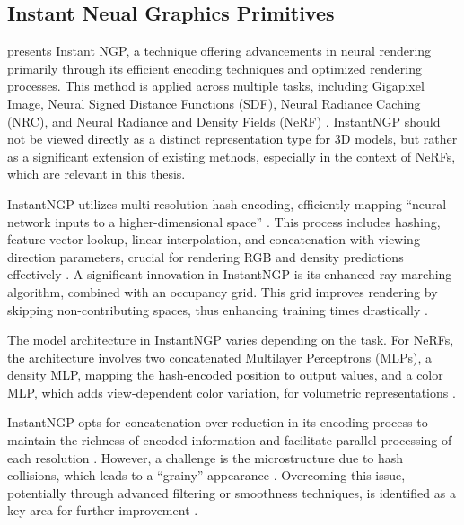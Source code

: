 \subsection{Instant Neual Graphics Primitives}\label{InstantNGP}

\citeauthor{M_ller_2022} presents Instant NGP, a technique offering advancements in neural rendering primarily through its efficient encoding techniques and optimized rendering processes. This method is applied across multiple tasks, including Gigapixel Image, Neural Signed Distance Functions (SDF), Neural Radiance Caching (NRC), and Neural Radiance and Density Fields (NeRF) \citep{M_ller_2022}. InstantNGP should not be viewed directly as a distinct representation type for 3D models, but rather as a significant extension of existing methods, especially in the context of NeRFs, which are relevant in this thesis.

InstantNGP utilizes multi-resolution hash encoding, efficiently mapping ``neural network inputs to a higher-dimensional space'' \citep{M_ller_2022}. This process includes hashing, feature vector lookup, linear interpolation, and concatenation with viewing direction parameters, crucial for rendering RGB and density predictions effectively \citep{M_ller_2022}. A significant innovation in InstantNGP is its enhanced ray marching algorithm, combined with an occupancy grid. This grid improves rendering by skipping non-contributing spaces, thus enhancing training times drastically \citep{M_ller_2022}.

The model architecture in InstantNGP varies depending on the task. For NeRFs, the architecture involves two concatenated Multilayer Perceptrons (MLPs), a density MLP, mapping the hash-encoded position to output values, and a color MLP, which adds view-dependent color variation, for volumetric representations \citep{M_ller_2022}.

InstantNGP opts for concatenation over reduction in its encoding process to maintain the richness of encoded information and facilitate parallel processing of each resolution \citep{M_ller_2022}. However, a challenge is the microstructure due to hash collisions, which leads to a ``grainy'' appearance \citep{M_ller_2022}. Overcoming this issue, potentially through advanced filtering or smoothness techniques, is identified as a key area for further improvement \citep{M_ller_2022}.